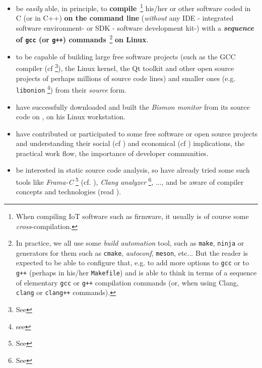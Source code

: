 \begin{itemize}
    \item be \emph{easily} able, in principle, to
      \textbf{compile}~\footnote{When compiling IoT software such as
        firmware, it usually is of course some
        \emph{cross}-compilation.}  his/her or other software coded in
      C (or in C++) \textbf{on the command line} (\emph{without} any
      IDE
      - integrated software
      environment- or  SDK
      - software development kit-)
      with a \textbf{\emph{sequence} of \texttt{gcc} (or \texttt{g++})
        commands}~\footnote{In practice, we all use some \emph{build
          automation} tool, such as \texttt{make}, \texttt{ninja} or
        generators for them such as \texttt{cmake}, \emph{autoconf},
        \texttt{meson}, etc... But the reader is expected to be able
        to configure that, e.g. to add more options to \texttt{gcc} or
        to \texttt{g++} (perhaps in his/her \texttt{Makefile}) and is
        able to think in terms of a sequence of elementary
        \texttt{gcc} or \texttt{g++} compilation commands (or, when
        using Clang, \texttt{clang} or \texttt{clang++} commands).}
      \textbf{on Linux}.



\item to be capable of building large free software projects (such as
  the GCC compiler (cf \cite{gcc-internals} \footnote{See
    }), the Linux kernel, the Qt toolkit and
  other open source projects of perhaps millions of source code lines)
  and smaller ones (e.g. \texttt{libonion} \footnote{see
    }) from their \emph{source}
  form.

\item have successfully downloaded and built the \emph{Bismon
  monitor} from its source code on
  , on his Linux workstation.
  
\item have contributed or participated to some free software or open
  source projects and understanding their social (cf
  \cite{Raymond:2001:CathBaz}) and economical (cf
  \cite{Weber:2004:SuccessOpenSource, Tirole:2016:EcoBienCommun,
    Nagle:2018:Contributing}) implications, the practical work flow,
  the importance of developer communities.
  
\item be interested in static source code analysis, so have already
  tried some such tools like \emph{Frama-C} \footnote{See
    } (cf. \cite{Cuoq:2012:Frama-C}),
  \emph{Clang analyzer} \footnote{See
    }, ..., and be aware of
   compiler concepts and technologies (read
  \cite{Aho:2006:DragonBook}).


\end{itemize}
